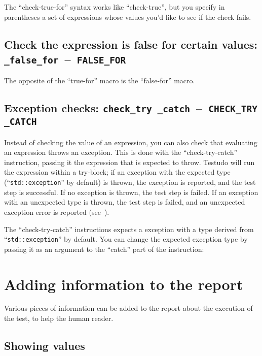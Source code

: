 \documentclass[twoside, a4paper, article]{memoir}
\newcommand*\testudocolor{\color{red!80!blue}}
\newcommand*\testudo[1]{\texttt{\testudocolor{}#1}}
\newcommand*\testudopair[2]{\testudo{#1}~--~\testudo{#2}}
\newcommand\subsectiontestudopair[3]{%
  \subsection[#1]{#1: \testudopair{#2}{#3}}}
\providecommand\typesetexample[1]{%
}
\begin{document}
The ``check-true-for'' syntax works like ``check-true'', but you specify in
parentheses a set of expressions whose values you'd like to see if the check
fails.

\typesetexample{check-true-for}

\subsectiontestudopair{Check the expression is false for certain values}%
{\_false\_for}{FALSE\_FOR}
\label{sec:check-expression-false-for}

The opposite of the ``true-for'' macro is the ``false-for'' macro.

\typesetexample{check-false-for}


\subsectiontestudopair{Exception checks}%
  {check\_try \_catch}{CHECK\_TRY \_CATCH}
\label{sec:exception-checks}

Instead of checking the value of an expression, you can also check that
evaluating an expression throws an exception.  This is done with the
``check-try-catch'' instruction, passing it the expression that is expected to
throw.  Testudo will run the expression within a try-block; if an exception
with the expected type (``\texttt{std::exception}'' by default) is thrown, the
exception is reported, and the test step is successful.  If no exception is
thrown, the test step is failed. If an exception with an unexpected type is
thrown, the test step is failed, and an unexpected exception error is reported
(see~).

\typesetexample{check-try-catch}

The ``check-try-catch'' instructions expects a exception with a type derived
from ``\texttt{std::exception}'' by default.  You can change the expected
exception type by passing it as an argument to the ``catch'' part of the
instruction:

\typesetexample{check-try-catch-exception}


\section{Adding information to the report}
\label{sec:adding-information-report}

Various pieces of information can be added to the report about the execution of
the test, to help the human reader.

\subsection{Showing values}
\label{sec:showing-values}
\end{document}
